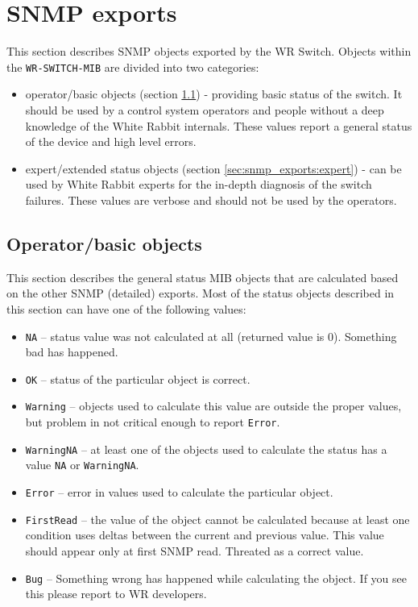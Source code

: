\section{SNMP exports}
\label{sec:snmp_exports}
This section describes SNMP objects exported by the WR Switch. Objects within
the \texttt{WR\--SWITCH\--MIB} are divided into two categories:
\begin{itemize}
  \item operator/basic objects (section \ref{sec:snmp_exports:basic}) -
    providing basic status of the switch. It should be used by a control system
    operators and people without a deep knowledge of the White Rabbit internals.
    These values report a general status of the device and high level errors.

  \item expert/extended status objects (section \ref{sec:snmp_exports:expert}) -
    can be used by White Rabbit experts for the in-depth diagnosis of the switch
    failures. These values are verbose and should not be used by the operators.
\end{itemize}

\subsection{Operator/basic objects}
\label{sec:snmp_exports:basic}
This section describes the general status MIB objects that are calculated based
on the other SNMP (detailed) exports. Most of the status objects described in
this section can have one of the following values:
\begin{itemize}%
  \item \texttt{NA} -- status value was not calculated at all (returned value
    is 0). Something bad has happened.
  \item \texttt{OK} -- status of the particular object is correct.
  \item \texttt{Warning} -- objects used to calculate this value are outside the
    proper values, but problem in not critical enough to report \texttt{Error}.
  \item \texttt{WarningNA} -- at least one of the objects used to calculate the
    status has a value \texttt{NA} or \texttt{WarningNA}.
  \item \texttt{Error} -- error in values used to calculate the particular
    object.
  \item \texttt{FirstRead} -- the value of the object cannot be calculated
    because at least one condition uses deltas between the current and previous
    value. This value should appear only at first SNMP read. Threated as a
    correct value.
  \item \texttt{Bug} -- Something wrong has happened while calculating the
    object. If you see this please report to WR developers.
\end{itemize}


